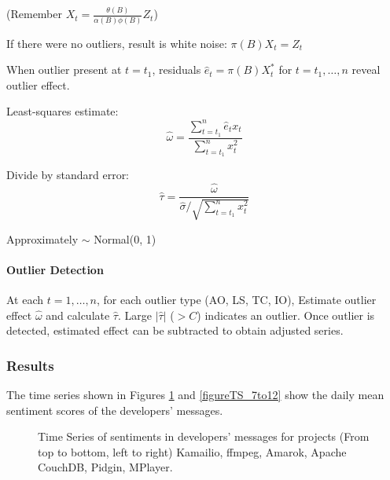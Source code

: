 \documentclass[12pt]{report}
\begin{document}
(Remember $X_t = \frac{\theta(B)}{\alpha(B) \phi(B)} Z_t$)

If there were no outliers, result is white noise: $\pi(B) X_t = Z_t$

When outlier present at $t = t_1$, residuals $\hat{e}_t = \pi(B) X^*_t$ for $t = t_1, \dots, n$ reveal outlier effect.

Least-squares estimate:
\begin{equation*}
\hat{\omega} = \frac{\sum_{t = t_1}^{n} \hat{e}_t x_{t}}{\sum_{t = t_1}^{n} x^2_{t}}
\end{equation*}

Divide by standard error:
\begin{equation*}
\hat{\tau} = \frac{\hat{\omega}}{\hat{\sigma} / \sqrt{\sum_{t = t_1}^{n} x^2_t}}
\end{equation*}

Approximately $\sim$ Normal(0, 1)

\paragraph{Outlier Detection}

At each $t = 1, \dots, n$, for each outlier type (AO, LS, TC, IO), Estimate outlier effect $\hat{\omega}$ and calculate $\hat{\tau}$. Large $|\hat{\tau}|$ ($> C$) indicates an outlier. Once outlier is detected, estimated effect can be subtracted to obtain adjusted series.\cite{Chen}

\subsubsection{Results}

The time series shown in Figures \ref{figureTS_1to6} and \ref{figureTS_7to12} show the daily mean sentiment scores of the developers' messages.

\begin{figure}[!htbp]
\caption{Time Series of sentiments in developers' messages for projects (From top to bottom, left to right) Kamailio, ffmpeg, Amarok, Apache CouchDB, Pidgin, MPlayer.}
\label{figureTS_1to6}
\end{figure}
\end{document}
